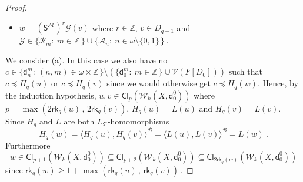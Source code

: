 \documentclass[10pt,a4paper, openany,  oldfontcommands]{memoir}
\newtheorem{open problem} [theorem] {Open Problem}
\newtheorem{open question} [theorem] {Open Question}
\renewcommand{\mathrm}{\mathsf}
\begin{document}
\begin{proof}
\begin{itemize}
\item[(b)]  $    w  =  \left(  \mathrm{S}^{  \mathcal{M}  }  \right)^r    \mathcal{G}  \left(   v  \right)   $  where  
$  r  \in  \mathbb{Z} $, 
$   v  \in  D_{q-1}     $
and     $  \mathcal{G}  \in    \lbrace  \mathcal{R}_m   :  \   m  \in  \mathbb{Z} \,   \rbrace   \cup 
 \lbrace  \mathcal{A}_n :  \   n  \in    \omega  \setminus \lbrace 0, 1   \rbrace  \,   \rbrace       \,   $.
\end{itemize}
We consider (a). 
In this case we also have no    $ c  \in  \big\{  \mathsf{d}^m_n :   \  (n, m  )  \in  \omega  \times  \mathbb{Z}  \,  \rbrace 
\setminus  \left(    \big\{  \mathsf{d}^m_0 :   \   m  \in   \mathbb{Z}  \,  \rbrace   \cup  \mathcal{V} \left(  F \left[ D_0  \right]   \right)    \right)   $ 
such that  $  c  \preceq    H_q (u)   $  or  $  c  \preceq  H_q ( v )  $  
since we would otherwise get  $  c  \preceq   H_q (w)  $. 
Hence, by the induction hypothesis,  
$  u,  v  \in     \mathsf{Cl}_{ p  }  \left(    \mathcal{W}_k  \left( X   ,  \mathsf{d}^0_0   \right)     \right)   $  
where    
$  p  =  \max  \left(   2 \mathsf{rk}_q  \left(   u \right)  \,  ,  \,  2 \mathsf{rk}_q  \left(  v  \right)   \right)     $, 
  $  H_q (u) = L(u)  $  and  $  H_q (v)  =  L(v)  $. 
  Since  $  H_q  $  and  $  L$  are both  $  L_{  \mathcal{T} }^-$-homomorphisms 
  \[
H_q (w)  =    \langle H_q (u) ,  H_q ( v )   \rangle^{  \mathcal{B}  }    =      \langle  L (u) ,  L   ( v )   \rangle^{  \mathcal{B}  } 
=  L(w) 
\      .
  \]
Furthermore 
\[
w  \in    \mathsf{Cl}_{ p +1    }  \left(    \mathcal{W}_k  \left( X   ,  \mathsf{d}^0_0  \right)     \right)     
\subseteq     \mathsf{Cl}_{ p + 2    }  \left(    \mathcal{W}_k  \left( X    ,  \mathsf{d}^0_0   \right)     \right)    
\subseteq  
  \mathsf{Cl}_{   2  \mathsf{rk}_q  \left(  w   \right) }  \left(    \mathcal{W}_k  \left( X    ,  \mathsf{d}^0_0 \right)    \right) 
\]
since  $   \mathsf{rk}_q  \left(  w   \right)   \geq   1  +   \max  \left(   \mathsf{rk}_q  \left(   u \right)  \,  ,  \,   \mathsf{rk}_q  \left(  v  \right)   \right)      \,    $.





\end{proof}
\end{document}
